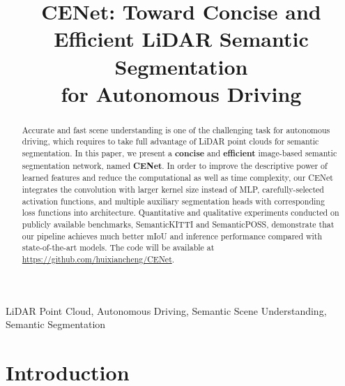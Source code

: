 \documentclass{article}
\begin{document}
\sloppy

\def\x{{\mathbf x}}
\def\L{{\cal L}}


\title{CENet: Toward Concise and Efficient LiDAR Semantic Segmentation\\ for Autonomous Driving}

\address{College of Computer and Information Science, Southwest University, Chongqing, China 
	\\ \tt\small\{chenghuixian\}@email.swu.edu.cn \quad \{xianfenghan, gqxiao\}@swu.edu.cn}


\maketitle


\begin{abstract}

Accurate and fast scene understanding is one of the challenging task for autonomous driving, which requires to take full advantage of LiDAR point clouds for semantic segmentation. In this paper, we present a \textbf{concise} and \textbf{efficient} image-based semantic segmentation network, named \textbf{CENet}. In order to improve the descriptive power of learned features and reduce the computational as well as time complexity, our CENet integrates the convolution with larger kernel size instead of MLP, carefully-selected activation functions, and multiple auxiliary segmentation heads with corresponding loss functions into architecture. Quantitative and qualitative experiments conducted on publicly available benchmarks, SemanticKITTI and SemanticPOSS, demonstrate that our pipeline achieves much better mIoU and inference performance compared with state-of-the-art models. The code will be available at \url{https://github.com/huixiancheng/CENet}.



\end{abstract}
\begin{keywords}
LiDAR Point Cloud, Autonomous Driving, Semantic Scene Understanding, Semantic Segmentation
\end{keywords}
\section{Introduction}
\label{sec:intro}
\end{document}
